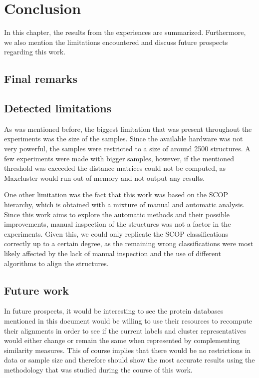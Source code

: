 \chapter{Conclusion}

In this chapter, the results from the experiences are summarized. Furthermore, we also mention the limitations encountered and discuss future prospects regarding this work.

\section{Final remarks}

\section{Detected limitations}

As was mentioned before, the biggest limitation that was present throughout the experiments was the size of the samples. Since the available hardware was not very powerful, the samples were restricted to a size of around 2500 structures. A few experiments were made with bigger samples, however, if the mentioned threshold was exceeded the distance matrices could not be computed, as Maxcluster would run out of memory and not output any results.

One other limitation was the fact that this work was based on the SCOP hierarchy, which is obtained with a mixture of manual and automatic analysis. Since this work aims to explore the automatic methods and their possible improvements, manual inspection of the structures was not a factor in the experiments. Given this, we could only replicate the SCOP classifications correctly up to a certain degree, as the remaining wrong classifications were most likely affected by the lack of manual inspection and the use of different algorithms to align the structures.

\section{Future work}

In future prospects, it would be interesting to see the protein databases mentioned in this document would be willing to use their resources to recompute their alignments in order to see if the current labels and cluster representatives would either change or remain the same when represented by complementing similarity measures. This of course implies that there would be no restrictions in data or sample size and therefore should show the most accurate results using the methodology that was studied during the course of this work.

